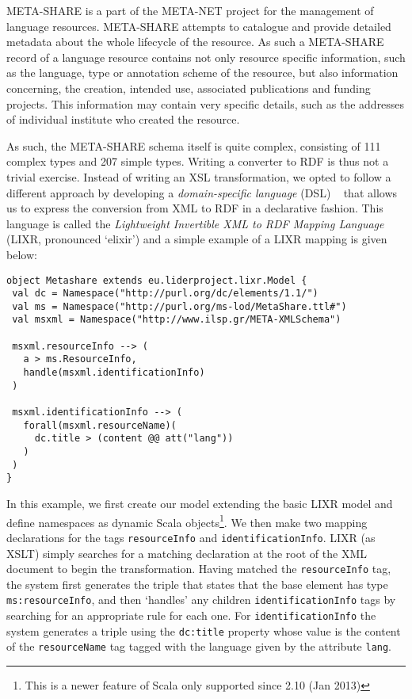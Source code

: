 \documentclass{acm_proc_article-sp}
\begin{document}
META-SHARE is a part of the META-NET project for the management of language resources. 
META-SHARE attempts to catalogue and provide detailed metadata about the whole
lifecycle of the resource. As such a META-SHARE record of a language resource
contains not only resource specific information, such as the language, type
or annotation scheme of the resource, but also information concerning, the
creation, intended use, associated publications and funding projects. This 
information may contain very specific details, such as the addresses of individual
institute who created the resource.

As such, the META-SHARE schema itself is quite complex, consisting of 111 complex types
and 207 simple types.
Writing a\textsc{} converter to RDF is thus not a trivial exercise. Instead of writing an
XSL transformation, we opted to follow a different approach by developing a
\emph{domain-specific language} (DSL) ~\cite{fowler2010domain} that allows us to express the conversion from XML to RDF in a declarative fashion.
This language is called the \textit{Lightweight Invertible XML to RDF Mapping
Language} (LIXR, pronounced `elixir') and a simple example of a
LIXR mapping is given below:

{\scriptsize
\begin{verbatim}
object Metashare extends eu.liderproject.lixr.Model {
 val dc = Namespace("http://purl.org/dc/elements/1.1/")
 val ms = Namespace("http://purl.org/ms-lod/MetaShare.ttl#")
 val msxml = Namespace("http://www.ilsp.gr/META-XMLSchema")

 msxml.resourceInfo --> (
   a > ms.ResourceInfo,
   handle(msxml.identificationInfo)
 )

 msxml.identificationInfo --> (
   forall(msxml.resourceName)(
     dc.title > (content @@ att("lang"))
   )
 )
}
\end{verbatim}}
In this example, we first create our model extending the basic LIXR model and
define namespaces as dynamic Scala objects\footnote{This is a newer feature of
Scala only supported since 2.10 (Jan 2013)}. We then make two mapping
declarations for the tags {\tt resourceInfo} and {\tt identifi\-cationInfo}. LIXR (as
XSLT) simply searches for a matching declaration at the root of the XML document
to begin the transformation. Having matched the {\tt resourceInfo} tag, the system
first generates the triple that states that the base element has type
{\tt ms:resourceInfo}, and then `handles' any children {\tt identi\-ficationInfo} tags by
searching for an appropriate rule for each one. For {\tt identificationInfo} the
system generates a triple using the {\tt dc:title} property whose value is the
content of the {\tt resourceName} tag tagged with the language given by the
attribute {\tt lang}.
\end{document}
